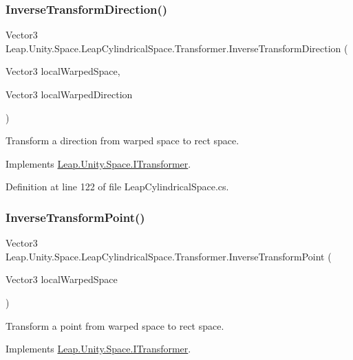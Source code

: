 \subsubsection{\texorpdfstring{InverseTransformDirection()}{InverseTransformDirection()}}
{\footnotesize\ttfamily Vector3 Leap.\+Unity.\+Space.\+Leap\+Cylindrical\+Space.\+Transformer.\+Inverse\+Transform\+Direction (\begin{DoxyParamCaption}\item[{Vector3}]{local\+Warped\+Space,  }\item[{Vector3}]{local\+Warped\+Direction }\end{DoxyParamCaption})}



Transform a direction from warped space to rect space. 



Implements \mbox{\hyperlink{interface_leap_1_1_unity_1_1_space_1_1_i_transformer_aa555a28ab51ed506732bb88756f06168}{Leap.\+Unity.\+Space.\+I\+Transformer}}.



Definition at line 122 of file Leap\+Cylindrical\+Space.\+cs.

\mbox{\label{class_leap_1_1_unity_1_1_space_1_1_leap_cylindrical_space_1_1_transformer_a4005272b32cd3040a830f43ad9e072d9}} 
\subsubsection{\texorpdfstring{InverseTransformPoint()}{InverseTransformPoint()}}
{\footnotesize\ttfamily Vector3 Leap.\+Unity.\+Space.\+Leap\+Cylindrical\+Space.\+Transformer.\+Inverse\+Transform\+Point (\begin{DoxyParamCaption}\item[{Vector3}]{local\+Warped\+Space }\end{DoxyParamCaption})}



Transform a point from warped space to rect space. 



Implements \mbox{\hyperlink{interface_leap_1_1_unity_1_1_space_1_1_i_transformer_ad919653073748169561e99cace4f5931}{Leap.\+Unity.\+Space.\+I\+Transformer}}.



